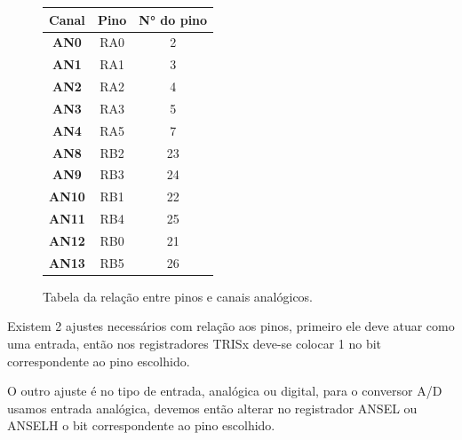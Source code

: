 \documentclass{article}
\begin{document}
\begin{figure}[H]

\centering
\begin{tabular}{|c|c|c|}
\hline
\rowcolor[HTML]{FFD966} 
\textbf{Canal} & \textbf{Pino} & \textbf{N° do pino} \\ \hline
\rowcolor[HTML]{FFFFFF} 
\textbf{AN0}   & RA0           & 2                   \\ \hline
\rowcolor[HTML]{FFFFFF} 
\textbf{AN1}   & RA1           & 3                   \\ \hline
\rowcolor[HTML]{FFFFFF} 
\textbf{AN2}   & RA2           & 4                   \\ \hline
\rowcolor[HTML]{FFFFFF} 
\textbf{AN3}   & RA3           & 5                   \\ \hline
\rowcolor[HTML]{FFFFFF} 
\textbf{AN4}   & RA5           & 7                   \\ \hline
\rowcolor[HTML]{FFFFFF} 
\textbf{AN8}   & RB2           & 23                  \\ \hline
\rowcolor[HTML]{FFFFFF} 
\textbf{AN9}   & RB3           & 24                  \\ \hline
\rowcolor[HTML]{FFFFFF} 
\textbf{AN10}  & RB1           & 22                  \\ \hline
\textbf{AN11}  & RB4           & 25                  \\ \hline
\textbf{AN12}  & RB0           & 21                  \\ \hline
\textbf{AN13}  & RB5           & 26                  \\ \hline
\end{tabular}

\caption{Tabela da relação entre pinos e canais analógicos.}
\label{PINChannelTable}
\end{figure}

Existem 2 ajustes necessários com relação aos pinos, primeiro ele deve atuar como uma entrada, então nos registradores TRISx deve-se colocar 1 no bit correspondente ao pino escolhido.\par

O outro ajuste é no tipo de entrada, analógica ou digital, para o conversor A/D usamos entrada analógica, devemos então alterar no registrador ANSEL ou ANSELH o bit correspondente ao pino escolhido.\par
\end{document}
